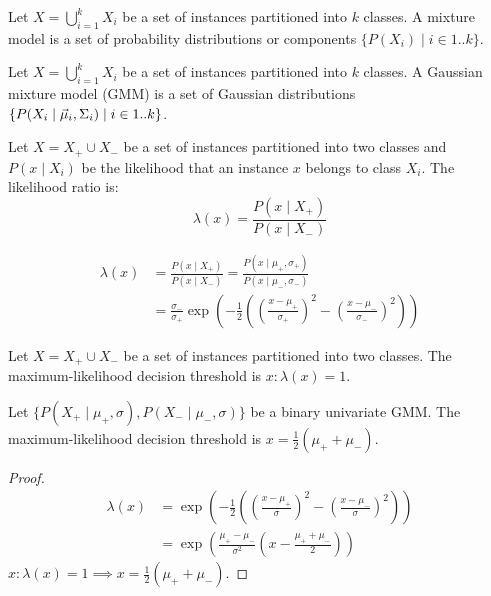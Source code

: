 \begin{dfn}
  Let $X = \bigcup_{i = 1}^k X_i$ be a set of instances partitioned into $k$ classes.
  A mixture model is a set of probability distributions or components $\{ P(X_i)
    \mid i \in 1 .. k \}$.
\end{dfn}

\begin{dfn}
  Let $X = \bigcup_{i = 1}^k X_i$ be a set of instances partitioned into $k$ classes.
  A Gaussian mixture model (GMM) is a set of Gaussian distributions $\{ P(X_i
    \mid \vec{\mu}_i, \Sigma_i) \mid i \in 1 .. k \}$.
\end{dfn}

\begin{dfn}
  Let $X = X_+ \cup X_-$ be a set of instances partitioned into two classes and
  $P(x \mid X_i)$ be the likelihood that an instance $x$ belongs to class $X_i$.
  The likelihood ratio is:
  \begin{equation*}
    \lambda(x) = \frac{P(x \mid X_+)}{P(x \mid X_-)}
  \end{equation*}
\end{dfn}

\begin{proposition}
  \begin{align*}
    \lambda(x)
     & = \frac{P(x \mid X_+)}{P(x \mid X_-)}
    = \frac{P(x \mid \mu_+, \sigma_+)}{P(x \mid \mu_-, \sigma_-)}
    \\
     & = \frac{\sigma_-}{\sigma_+}\exp\left(-\frac{1}{2}\left(
      \left(\frac{x - \mu_+}{\sigma_+} \right)^2 -
      \left(\frac{x - \mu_-}{\sigma_-} \right)^2
      \right)\right)
  \end{align*}
\end{proposition}

\begin{dfn}
  Let $X = X_+ \cup X_-$ be a set of instances partitioned into two classes.
  The maximum-likelihood decision threshold is $x : \lambda(x) = 1$.
\end{dfn}

\begin{proposition}
  Let $\{ P(X_+ \mid \mu_+, \sigma), P(X_- \mid \mu_-, \sigma) \}$ be a binary
  univariate GMM.
  The maximum-likelihood decision threshold is $x = \frac{1}{2}(\mu_+ + \mu_-)$.
  \begin{proof}
    \begin{align*}
      \lambda(x)
       & = \exp\left(-\frac{1}{2}\left(
        \left(\frac{x - \mu_+}{\sigma} \right)^2 -
        \left(\frac{x - \mu_-}{\sigma} \right)^2
        \right)\right)
      \\[2ex]
       & = \exp\left(\frac{\mu_+ - \mu_-}{\sigma^2}\left(
        x - \frac{\mu_+ + \mu_-}{2}
        \right)\right)
    \end{align*}
    $x : \lambda(x) = 1 \implies x = \frac{1}{2}(\mu_+ + \mu_-)$.
  \end{proof}
\end{proposition}

